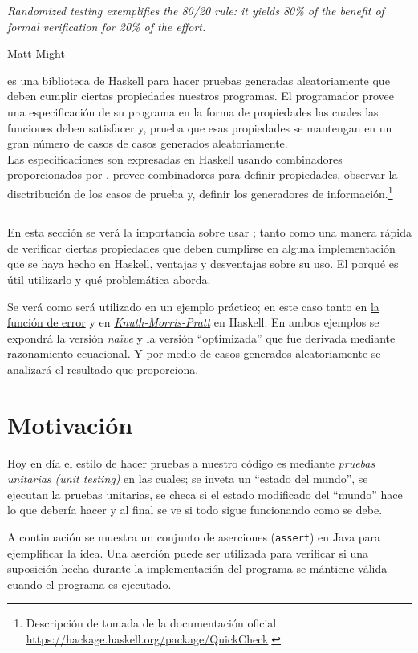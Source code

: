 \epigraph{\itshape Randomized testing exemplifies the 80/20 rule: it yields 80\% of the benefit
of formal verification for 20\% of the effort.}{Matt Might}

\QuickCheck es una biblioteca de Haskell para hacer pruebas generadas aleatoriamente que deben
cumplir ciertas propiedades nuestros programas. El programador provee una especificación de su
programa en la forma de propiedades las cuales las funciones deben satisfacer y, \QuickCheck prueba
que esas propiedades se mantengan en un gran número de casos de casos generados aleatoriamente.\\
Las especificaciones son expresadas en Haskell usando combinadores proporcionados por \QuickCheck.
\QuickCheck provee combinadores para definir propiedades, observar la disctribución de los casos
de prueba y, definir los generadores de información.\footnote{
    Descripción de \QuickCheck tomada de la documentación oficial\\
    \url{https://hackage.haskell.org/package/QuickCheck}.
}

\noindent\rule{\textwidth}{1pt}
\hfill \break

En esta sección se verá la importancia sobre usar \QuickCheck; tanto como una manera rápida de
verificar ciertas propiedades que deben cumplirse en alguna implementación que se haya hecho en
Haskell, ventajas y desventajas sobre su uso. El porqué es útil utilizarlo y qué problemática
aborda.

Se verá como será utilizado en un ejemplo práctico; en este caso tanto en
\hyperlink{funcional:funcion_error}{la función de error} y en
\hyperlink{funcional:kmp}{\textit{Knuth-Morris-Pratt}} en Haskell. En ambos ejemplos se expondrá la
versión \textit{naïve} y la versión ``optimizada'' que fue derivada mediante razonamiento
ecuacional. Y por medio de casos generados aleatoriamente se analizará el resultado que
\QuickCheck proporciona.

\section{Motivación}
Hoy en día el estilo de hacer pruebas a nuestro código es mediante \textit{pruebas unitarias (unit
testing)} en las cuales; se inveta un ``estado del mundo'', se ejecutan la pruebas unitarias, se
checa si el estado modificado del ``mundo'' hace lo que debería hacer y al final se ve si todo
sigue funcionando como se debe.

A continuación se muestra un conjunto de aserciones (\texttt{assert}) en Java para ejemplificar
la idea. Una aserción puede ser utilizada para verificar si una suposición hecha durante la
implementación del programa se mántiene válida cuando el programa es ejecutado.

